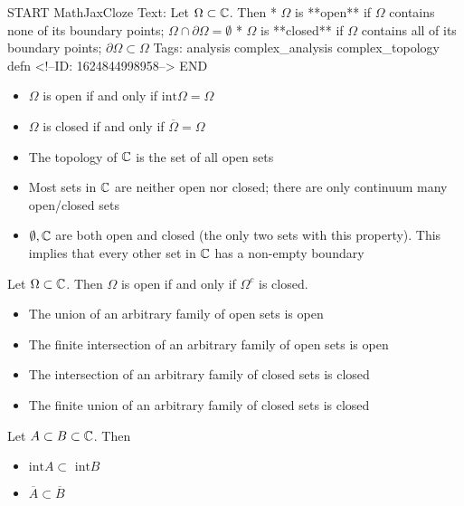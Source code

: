 \documentclass{memoir}
\begin{document}
\begin{anki}
START
MathJaxCloze
Text: Let \(\Omega\subset \mathbb{C}\). Then
* \(\Omega\) is **open** if \(\Omega\) contains none of its boundary points; \(\Omega \cap \partial \Omega = \emptyset\)
* \(\Omega\) is **closed** if \(\Omega\) contains all of its boundary points; \(\partial \Omega \subset \Omega\)
Tags: analysis complex_analysis complex_topology defn
<!--ID: 1624844998958-->
END
\end{anki}

\begin{exmp}
\begin{itemize}
	\item \(\Omega\) is open if and only if \( \textrm{int}\Omega = \Omega\) 
	\item \(\Omega\) is closed if and only if \(\overline{\Omega} = \Omega\) 
	\item The topology of \(\mathbb{C}\) is the set of all open sets
	\item Most sets in \(\mathbb{C}\) are neither open nor closed; there are only continuum many open/closed sets
	\item \(\emptyset,\mathbb{C}\) are both open and closed (the only two sets with this property). This implies that every other set in \(\mathbb{C}\) has a non-empty boundary
\end{itemize}
\end{exmp}

\begin{prop}
	Let \(\Omega\subset \mathbb{C}\). Then \(\Omega\) is open if and only if \(\Omega^{c}\) is closed.
\end{prop}

\begin{prop}
	\begin{itemize}
		\item The union of an arbitrary family of open sets is open
		\item The finite intersection of an arbitrary family of open sets is open
		\item The intersection of an arbitrary family of closed sets is closed
		\item The finite union of an arbitrary family of closed sets is closed
	\end{itemize}
\end{prop}

\begin{prop}
	Let \(A\subset B\subset \mathbb{C}\). Then 
	\begin{itemize}
		\item \( \textrm{int}A \subset \textrm{ int}B\) 
		\item \(\overline{A}\subset \overline{B}\)
	\end{itemize}
\end{prop}
\end{document}
